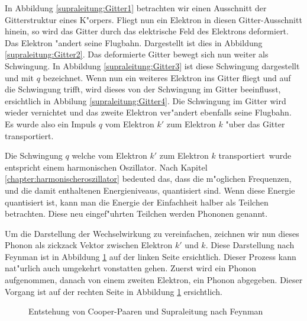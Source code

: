 \begin{refsection}
In Abbildung \ref{supraleitung:Gitter1} betrachten wir einen Ausschnitt der Gitterstruktur eines K"orpers.
Fliegt nun ein Elektron in diesen Gitter-Ausschnitt hinein, so wird das Gitter durch das
elektrische Feld des Elektrons deformiert.
Das Elektron "andert seine Flugbahn.
Dargestellt ist dies in Abbildung \ref{supraleitung:Gitter2}.
Das deformierte Gitter bewegt sich nun weiter als Schwingung.
In Abbildung \ref{supraleitung:Gitter3} ist diese Schwingung dargestellt und mit $q$ bezeichnet.
Wenn nun ein weiteres Elektron ins Gitter fliegt und auf die Schwingung trifft,
wird dieses von der Schwingung im Gitter beeinflusst, ersichtlich in Abbilung \ref{supraleitung:Gitter4}.
Die Schwingung im Gitter wird wieder vernichtet und das zweite Elektron ver"andert
ebenfalls seine Flugbahn.
Es wurde also ein Impuls $q$ vom Elektron $k'$ zum Elektron $k$ "uber das Gitter transportiert. 

Die Schwingung $q$ welche vom Elektron $k'$ zum Elektron $k$ \glqq transportiert\grqq~wurde
entspricht einem harmonischen Oszillator.
Nach Kapitel \ref{chapter:harmonischeroszillator} bedeuted das, dass die m"oglichen Frequenzen,
und die damit enthaltenen Energieniveaus, quantisiert sind.
Wenn diese Energie quantisiert ist, kann man die Energie der Einfachheit halber als Teilchen betrachten.
Diese neu eingef"uhrten Teilchen werden Phononen  genannt.

Um die Darstellung der Wechselwirkung zu vereinfachen, zeichnen wir nun dieses Phonon
als zickzack Vektor zwischen Elektron $k'$ und $k$. Diese Darstellung nach Feynman
ist in Abbildung \ref{supraleitung:FeynmanDiagram1} auf der linken Seite ersichtlich.
Dieser Prozess kann nat"urlich auch umgekehrt vonstatten gehen.
Zuerst wird ein Phonon aufgenommen, danach von einem zweiten Elektron, ein Phonon abgegeben.
Dieser Vorgang ist auf der rechten Seite in Abbildung \ref{supraleitung:FeynmanDiagram1} ersichtlich.

\begin{figure} %
\centering

\caption{Entstehung von Cooper-Paaren und Supraleitung nach Feynman \cite{supraleitung:feynman}
\label{supraleitung:FeynmanDiagram1}}
\end{figure}


\end{refsection}
